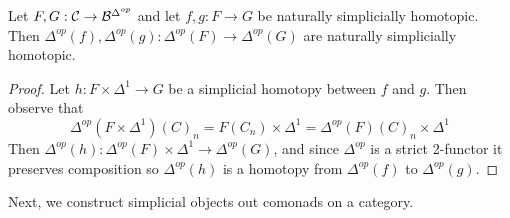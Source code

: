 \begin{lem}[label=lem:Precomp]
    Let $F,G: \mathcal{C}\rightarrow \mathcal{B}^{\Delta^{op}}$ and let $f,g:F\to G$ be naturally simplicially homotopic. Then $\Delta^{op}(f),\Delta^{op}(g):\Delta^{op}(F)\to\Delta^{op}(G)$ are naturally simplicially homotopic.
\end{lem}
\begin{proof}
    Let $h:F\times \Delta^1\to G$ be a simplicial homotopy between $f$ and $g$. Then observe that 
    \begin{equation*}
        \Delta^{op}(F\times \Delta^1)(C)_n = F(C_n)\times \Delta^1 = \Delta^{op}(F)(C)_n\times \Delta^1
    \end{equation*}
    Then $\Delta^{op}(h):\Delta^{op}(F)\times \Delta^1\to \Delta^{op}(G)$, and since $\Delta^{op}$ is a strict 2-functor it preserves composition so $\Delta^{op}(h)$ is a homotopy from $\Delta^{op}(f)$ to $\Delta^{op}(g)$.
\end{proof}

Next, we construct simplicial objects out comonads on a category.


